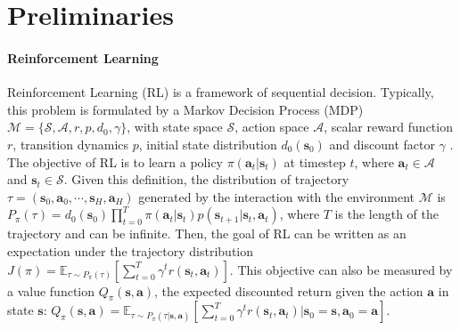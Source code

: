 \section{Preliminaries}
\paragraph{Reinforcement Learning} Reinforcement Learning (RL) is a framework of sequential decision.
Typically, this problem is formulated by a Markov Decision Process (MDP) $\mathcal{M}=\{\mathcal{S},\mathcal{A},r,p,d_0,\gamma\}$, with state space $\mathcal{S}$, action space $\mathcal{A}$, scalar reward function $r$, transition dynamics $p$, initial state distribution $d_0(\mathbf{s}_0)$ and discount factor $\gamma$ \citep{sutton1998introduction}.
The objective of RL is to learn a policy $\pi\left(\mathbf{a}_t|\mathbf{s}_t\right)$ at timestep $t$, where $\mathbf{a}_t \in \mathcal{A}$ and $\mathbf{s}_t \in \mathcal{S}$.
Given this definition, the distribution of trajectory $\tau=\left(\mathbf{s}_0, \mathbf{a}_0, \cdots, \mathbf{s}_H, \mathbf{a}_H\right)$ generated by the interaction with the environment $\mathcal{M}$ is $P_{\pi}\left(\tau\right) = d_0(\mathbf{s}_0) \prod_{t=0}^{T} \pi\left(\mathbf{a}_t|\mathbf{s}_t\right) p\left(\mathbf{s}_{t+1}|\mathbf{s}_t,\mathbf{a}_t\right)$,
where $T$ is the length of the trajectory and can be infinite. Then, the goal of RL can be written as an expectation under the trajectory distribution $J\left(\pi\right) = \mathbb{E}_{\tau \sim P_{\pi}\left(\tau\right)}\left[ \sum_{t=0}^{T} \gamma^t r(\mathbf{s}_t, \mathbf{a}_t)\right]$. 
This objective can also be measured by a value function $Q_{\pi}\left(\mathbf{s},\mathbf{a}\right)$, the expected discounted return given the action $\mathbf{a}$ in state $\mathbf{s}$: $Q_{\pi}\left(\mathbf{s},\mathbf{a}\right) = \mathbb{E}_{\tau \sim P_{\pi}\left(\tau|\mathbf{s},\mathbf{a}\right)}\left[ \sum_{t=0}^{T} \gamma^t r(\mathbf{s}_t,\mathbf{a}_t)|\mathbf{s}_0=\mathbf{s},\mathbf{a}_0=\mathbf{a}\right]$. 

